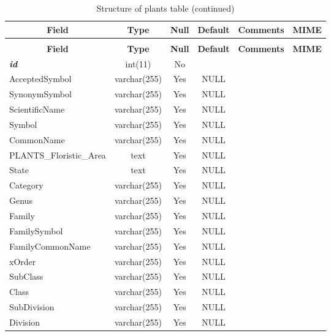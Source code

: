 \begin{enumerate}
%
%
 \begin{longtable}{|l|c|c|c|l|l|} 
 \caption{Structure of plants table} \label{tab:plants} \\
 \hline \multicolumn{1}{|c|}{\textbf{Field}} & \multicolumn{1}{|c|}{\textbf{Type}} & \multicolumn{1}{|c|}{\textbf{Null}} & \multicolumn{1}{|c|}{\textbf{Default}} & \multicolumn{1}{|c|}{\textbf{Comments}} & \multicolumn{1}{|c|}{\textbf{MIME}} \\ \hline \hline
\endfirsthead
 \caption{Structure of plants table (continued)} \\ 
 \hline \multicolumn{1}{|c|}{\textbf{Field}} & \multicolumn{1}{|c|}{\textbf{Type}} & \multicolumn{1}{|c|}{\textbf{Null}} & \multicolumn{1}{|c|}{\textbf{Default}} & \multicolumn{1}{|c|}{\textbf{Comments}} & \multicolumn{1}{|c|}{\textbf{MIME}} \\ \hline \hline \endhead \endfoot 
\textbf{\textit{id}} & int(11) & No &  &  &  \\ \hline 
AcceptedSymbol & varchar(255) & Yes & NULL &  &  \\ \hline 
SynonymSymbol & varchar(255) & Yes & NULL &  &  \\ \hline 
ScientificName & varchar(255) & Yes & NULL &  &  \\ \hline 
Symbol & varchar(255) & Yes & NULL &  &  \\ \hline 
CommonName & varchar(255) & Yes & NULL &  &  \\ \hline 
PLANTS\_Floristic\_Area & text & Yes & NULL &  &  \\ \hline 
State & text & Yes & NULL &  &  \\ \hline 
Category & varchar(255) & Yes & NULL &  &  \\ \hline 
Genus & varchar(255) & Yes & NULL &  &  \\ \hline 
Family & varchar(255) & Yes & NULL &  &  \\ \hline 
FamilySymbol & varchar(255) & Yes & NULL &  &  \\ \hline 
FamilyCommonName & varchar(255) & Yes & NULL &  &  \\ \hline 
xOrder & varchar(255) & Yes & NULL &  &  \\ \hline 
SubClass & varchar(255) & Yes & NULL &  &  \\ \hline 
Class & varchar(255) & Yes & NULL &  &  \\ \hline 
SubDivision & varchar(255) & Yes & NULL &  &  \\ \hline 
Division & varchar(255) & Yes & NULL &  &  \\ \hline 

\end{longtable}
\end{enumerate}
